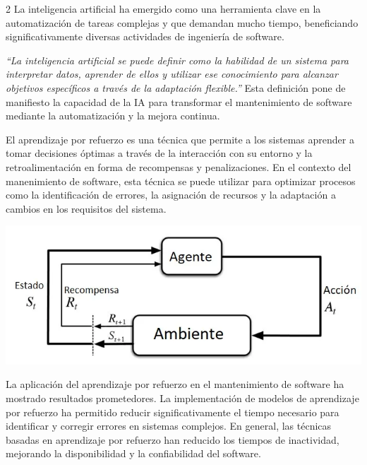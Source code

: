 \documentclass[12pt,spanish,Letterpaper,openany]{book}
\begin{document}
\begin {multicols}{2}
La inteligencia artificial ha emergido como una herramienta clave en la automatización de tareas complejas y que demandan mucho tiempo, beneficiando significativamente diversas actividades de ingeniería de software.

\emph{``La inteligencia artificial se puede definir como la habilidad de un sistema para interpretar datos, aprender de ellos y utilizar ese conocimiento para alcanzar objetivos específicos a través de la adaptación flexible.''} Esta definición pone de manifiesto la capacidad de la IA para transformar el mantenimiento de software mediante la automatización y la mejora continua.

El aprendizaje por refuerzo es una técnica que permite a los sistemas aprender a tomar decisiones óptimas a través de la interacción con su entorno y la retroalimentación en forma de recompensas y penalizaciones. En el contexto del manenimiento de software, esta técnica se puede utilizar para optimizar procesos como la identificación de errores, la asignación de recursos y la adaptación a cambios en los requisitos del sistema.

\begin {flushleft}
\noindent\begin{minipage}[c]{\columnwidth}

\begin{center}\includegraphics[width=0.9\linewidth]{imagenes_articulos/sp55_02} \end{center}

\end{minipage}
\end {flushleft}

La aplicación del aprendizaje por refuerzo en el mantenimiento de software ha mostrado resultados prometedores. La implementación de modelos de aprendizaje por refuerzo ha permitido reducir significativamente el tiempo necesario para identificar y corregir errores en sistemas complejos. En general, las técnicas basadas en aprendizaje por refuerzo han
reducido los tiempos de inactividad, mejorando la disponibilidad y la confiabilidad del software.


\end{multicols}
\end{document}
